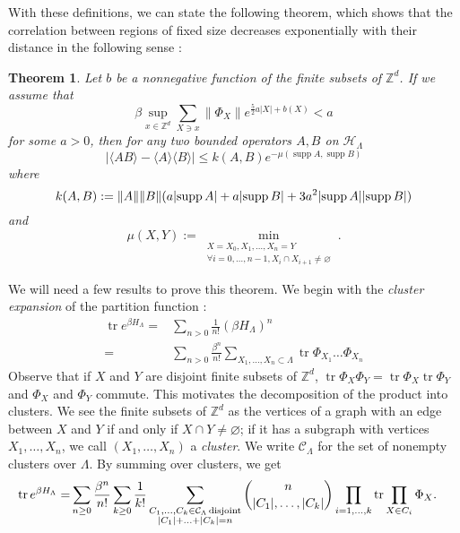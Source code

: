 \documentclass{article}
\DeclarePairedDelimiter\abs{\lvert}{\rvert}
\newtheorem{thm}{Theorem}[section]
\DeclareMathOperator{\disj}{disjoint}
\DeclareMathOperator{\tr}{tr}
\DeclareMathOperator{\supp}{supp}
\begin{document}
 With these definitions, we can state the following theorem, which shows that the correlation between regions of fixed size decreases exponentially with their distance in the following sense :
 \begin{thm}
     \label{thm:exp_decay_of_correlations}
     Let $b$ be a nonnegative function of the finite subsets of $\mathbb Z^d$.
     If we assume that 
     \begin{equation}
         \label{eq:hypothesis}
         \beta\sup_{x\in\mathbb Z^d}\sum_{X\ni x}\lVert\Phi_X\rVert e^{\frac{5}{2}a|X|+b(X)}<a
         \end{equation}
     for some $a>0$, then for any two bounded operators $A,B$ on $\mathcal H_\Lambda$
     $$|\langle AB\rangle - \langle A\rangle\langle B\rangle|\leq k(A,B)e^{-\mu(\supp A,\supp B)}$$
     where $$k(A,B):=\lVert A\rVert\lVert B\rVert(a\abs{\supp A}+a\abs{\supp B} + 3a^2\abs{\supp A}\abs{\supp B})$$ and 
     $$
     \mu(X,Y):= \min_{\substack{X=X_0,X_1,\ldots,X_n=Y \\ \forall i=0,\ldots,n-1, X_i\cap X_{i+1}\neq \varnothing}}.
     $$
 \end{thm}
    We will need a few results to prove this theorem.
     We begin with the {\it cluster expansion} of the partition function :
     \begin{align*}
         \tr e^{\beta H_\Lambda}=&\sum_{n>0}\frac{1}{n!}(\beta H_\Lambda)^n\\
         =&\sum_{n>0}\frac{\beta^n}{n!}\sum_{X_1,\ldots, X_n\subset \Lambda}\tr\Phi_{X_1}\ldots\Phi_{X_n}
     \end{align*}
     Observe that if $X$ and $Y$ are disjoint finite subsets of $\mathbb Z^d$, $\tr \Phi_X\Phi_Y=\tr \Phi_X \tr\Phi_Y$ and $\Phi_X$ and $\Phi_Y$ commute.
    This motivates the decomposition of the product into clusters.
    We see the finite subsets of $\mathbb Z^d$ as the vertices of a graph with an edge between $X$ and $Y$ if and only if $X\cap Y\neq \varnothing$; if it has a subgraph with vertices $X_1,\ldots,X_n$, we call $(X_1,\ldots,X_n)$ a {\it cluster}.
    We write $\mathcal C_\Lambda$ for the set of nonempty clusters over $\Lambda$.
    By summing over clusters, we get 
    \begin{align*}
        \tr e^{\beta H_\Lambda}=&\sum_{n\geq0}\frac {\beta^n} {n!} \sum_{k\geq 0}\frac{1}{k!}\sum_{\substack{C_1,\ldots,C_k\in\mathcal C_\Lambda \disj\\\abs{C_1}+\ldots+\abs{C_k}=n}}\binom{n}{\abs{C_1},\ldots,\abs{C_k}}\prod_{i=1,\ldots,k}\tr\prod_{X\in C_i}\Phi_X.
    \end{align*}
\end{document}
